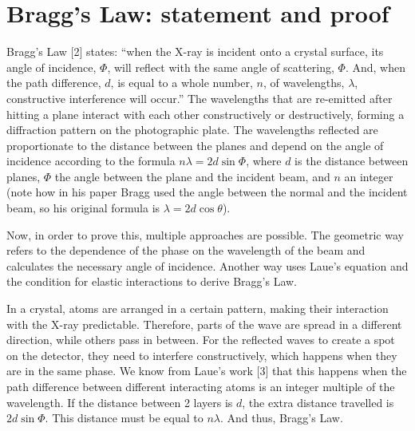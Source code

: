 \section{Bragg's Law: statement and proof}

Bragg's Law [2] states: ``when the X-ray is incident onto a crystal surface,
its angle of incidence, $\Phi$, will reflect with the same angle of
scattering, $\Phi$.  And, when the path difference, $d$, is equal to a whole
number, $n$, of wavelengths, $\lambda$, constructive interference will
occur.''  The wavelengths that are re-emitted after hitting a plane interact
with each other constructively or destructively, forming a diffraction pattern
on the photographic plate.  The wavelengths reflected are proportionate to the
distance between the planes and depend on the angle of incidence according to
the formula $n\lambda=2d\sin{\Phi}$, where $d$ is the distance between planes,
$\Phi$ the angle between the plane and the incident beam, and $n$ an integer
(note how in his paper Bragg used the angle between the normal and the incident
beam, so his original formula is $\lambda=2d\cos{\theta}$).

Now, in order to prove this, multiple approaches are possible.  The geometric
way refers to the dependence of the phase on the wavelength of the beam and
calculates the necessary angle of incidence.  Another way uses Laue's equation
and the condition for elastic interactions to derive Bragg's Law.

In a crystal, atoms are arranged in a certain pattern, making their interaction
with the X-ray predictable.  Therefore, parts of the wave are spread in a
different direction, while others pass in between.  For the reflected waves to
create a spot on the detector, they need to interfere constructively, which
happens when they are in the same phase.  We know from Laue's work [3] that
this happens when the path difference between different interacting atoms is an
integer multiple of the wavelength.  If the distance between 2 layers is $d$,
the extra distance travelled is $2d\sin{\Phi}$.  This distance must be equal
to $n\lambda$.  And thus, Bragg's Law.

